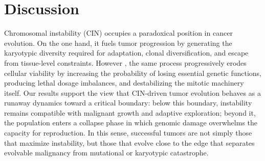 \documentclass[10pt, aps, rmp,  twocolumn, superscriptaddress, floatfix, showkeys]{revtex4-2}
\begin{document}
\section*{Discussion}


Chromosomal instability (CIN) occupies a paradoxical position in 
cancer evolution. On the one hand, it fuels tumor progression by 
generating the karyotypic diversity required for adaptation, clonal 
diversification, and escape from tissue-level constraints. However
, the same process progressively erodes cellular viability 
by increasing the probability of losing essential genetic functions, 
producing lethal dosage imbalances, and destabilizing the mitotic 
machinery itself. Our results support the view that CIN-driven tumor 
evolution behaves as a runaway dynamics toward a critical boundary: 
below this boundary, instability remains compatible with malignant 
growth and adaptive exploration; beyond it, the population enters a 
collapse phase in which genomic damage overwhelms the capacity for 
reproduction. In this sense, successful tumors are not simply those 
that maximize instability, but those that evolve close to the edge 
that separates evolvable malignancy from mutational or karyotypic 
catastrophe.
\end{document}
